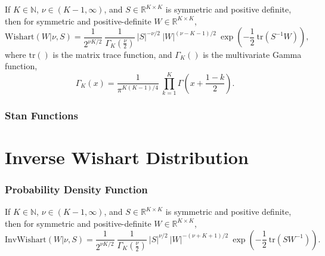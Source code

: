 \begin{description}
{If $K \in \mathbb{N}$, $\nu \in (K-1,\infty)$, and $S \in \mathbb{R}^{K \times K}$ is symmetric and positive definite, then for symmetric and positive-definite $W \in \mathbb{R}^{K \times K}$, \[ \text{Wishart}(W|\nu,S) = \frac{1}{2^{\nu K / 2}} \ \frac{1}{\Gamma_K \! \left( \frac{\nu}{2} \right)} \ \left| S \right|^{-\nu/2} \ \left| W \right|^{(\nu - K - 1)/2} \ \exp \! \left(- \frac{1}{2} \ \text{tr}\left( S^{-1} W \right) \right) \! , \] where $\text{tr}()$ is the matrix trace function, and $\Gamma_K()$ is the multivariate Gamma function, \[ \Gamma_K(x) = \frac{1}{\pi^{K(K-1)/4}} \ \prod_{k=1}^K \Gamma \left( x + \frac{1 - k}{2} \right) \!. \] 



\subsubsection{Stan Functions}


\begin{description}  \end{description}


\begin{description}  \end{description}


\section{Inverse Wishart Distribution}


\subsubsection{Probability Density Function}


If $K \in \mathbb{N}$, $\nu \in (K-1,\infty)$, and $S \in \mathbb{R}^{K \times   K}$ is symmetric and positive definite, then for symmetric and positive-definite $W \in \mathbb{R}^{K \times K}$, \[ \text{InvWishart}(W|\nu,S) = \frac{1}{2^{\nu K / 2}} \ \frac{1}{\Gamma_K \! \left( \frac{\nu}{2} \right)} \ \left| S \right|^{\nu/2} \ \left| W \right|^{-(\nu + K + 1)/2} \ \exp \! \left( - \frac{1}{2} \ \text{tr}(SW^{-1}) \right) \! . \] 

}
\end{description}
